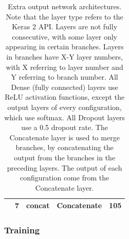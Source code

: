 \begin{table}[h!]
\begin{center}
\begin{tabular}{|c|c|c|c|c|}
& 7 & concat & Concatenate & 105 \\ \hline
\end{tabular}
\end{center}
\caption[Extra output architectures]{Extra output network architectures. Note that the layer type refers to the Keras 2 API. Layers are not fully consecutive, with some layer only appearing in certain branches. Layers in branches have X-Y layer numbers, with X referring to layer number and Y referring to branch number. All Dense (fully connected) layers use ReLU activation functions, except the output layers of every configuration, which use softmax. All Dropout layers use a 0.5 dropout rate. The Concatenate layer is used to merge branches, by concatenating the output from the branches in the preceding layers. The output of each configuration come from the Concatenate layer.}
\label{tab:ex-out-arch}
\end{table}

\subsubsection{Training}











\cleardoublepage